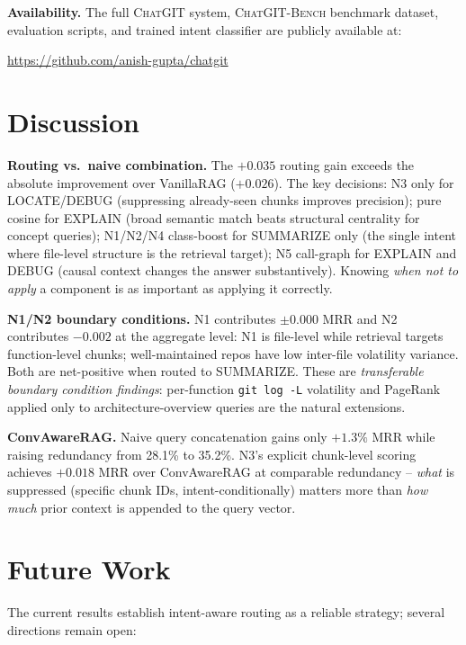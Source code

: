\documentclass[conference]{IEEEtran}
\newcommand{\chatgit}{\textsc{ChatGIT}\xspace}
\newcommand{\conv}{\textsc{ChatGIT-Bench}\xspace}
\begin{document}
\smallskip
\noindent\textbf{Availability.}
The full \chatgit system, \conv benchmark dataset, evaluation scripts,
and trained intent classifier are publicly available at:
\begin{center}
\url{https://github.com/anish-gupta/chatgit}
\end{center}

\section{Discussion}

\textbf{Routing vs.\ naive combination.} The $+0.035$ routing gain
exceeds the absolute improvement over VanillaRAG ($+0.026$). The key
decisions: N3 only for LOCATE/DEBUG (suppressing already-seen chunks
improves precision); pure cosine for EXPLAIN (broad semantic match
beats structural centrality for concept queries); N1/N2/N4 class-boost
for SUMMARIZE only (the single intent where file-level structure is the
retrieval target); N5 call-graph for EXPLAIN and DEBUG (causal context
changes the answer substantively). Knowing \emph{when not to apply}
a component is as important as applying it correctly.

\textbf{N1/N2 boundary conditions.} N1 contributes $\pm$0.000 MRR and
N2 contributes $-0.002$ at the aggregate level: N1 is file-level while
retrieval targets function-level chunks; well-maintained repos have low
inter-file volatility variance. Both are net-positive when routed to
SUMMARIZE. These are \emph{transferable boundary condition findings}:
per-function \texttt{git log -L} volatility and PageRank applied only
to architecture-overview queries are the natural extensions.

\textbf{ConvAwareRAG.} Naive query concatenation gains only $+1.3\%$
MRR while raising redundancy from 28.1\% to 35.2\%. N3's explicit
chunk-level scoring achieves $+0.018$ MRR over ConvAwareRAG at
comparable redundancy -- \emph{what} is suppressed (specific chunk IDs,
intent-conditionally) matters more than \emph{how much} prior context
is appended to the query vector.

\section{Future Work}

The current results establish intent-aware routing as a reliable
strategy; several directions remain open:
\end{document}
